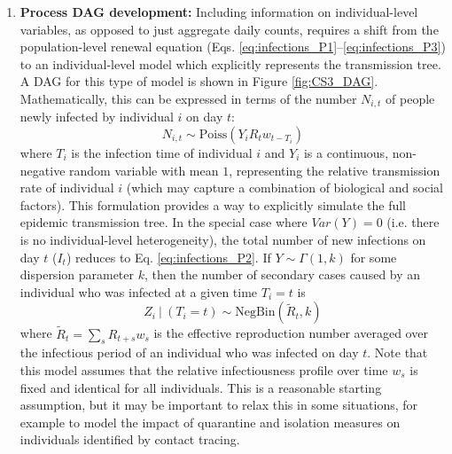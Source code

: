 \documentclass{article}
\begin{document}
\begin{enumerate}
    \item \textbf{Process DAG development:} Including information on individual-level variables, as opposed to just aggregate daily counts, requires a shift from the population-level renewal equation (Eqs. \eqref{eq:infections_P1}--\eqref{eq:infections_P3}) to an individual-level model which explicitly represents the transmission tree. A DAG for this type of model is shown in Figure \ref{fig:CS3_DAG}. Mathematically, this can be expressed in terms of the number $N_{i,t}$ of people newly infected by individual $i$ on day $t$:
    \begin{equation} \label{eq:individual_level}
    N_{i,t} \sim \mathrm{Poiss} \left( Y_i R_t w_{t-T_i} \right)
    \end{equation}
    where $T_i$ is the infection time of individual $i$ and $Y_i$ is a continuous, non-negative random variable with mean $1$, representing the relative transmission rate of individual $i$ (which may capture a combination of biological and social factors). This formulation provides a way to explicitly simulate the full epidemic transmission tree.  In the special case where $Var(Y)=0$ (i.e. there is no individual-level heterogeneity), the total number of new infections on day $t$ ($I_t$) reduces to Eq. \eqref{eq:infections_P2}. 
    If $Y\sim \Gamma(1,k)$ for some dispersion parameter $k$, then the number of secondary cases caused by an individual who was infected at a given time $T_i=t$ is \citep{lloyd2005superspreading}
     \begin{equation} \label{eq:offspring_dist}
        Z_i \ | \ (T_i=t) \sim \mathrm{NegBin}\left( \tilde{R}_{t}, k\right)
    \end{equation}   
    where $\tilde{R}_t= \sum_s R_{t+s} w_s$ is the effective reproduction number averaged over the infectious period of an individual who was infected on day $t$.
    Note that this model assumes that the relative infectiousness profile over time $w_s$ is fixed and identical for all individuals. This is a reasonable starting assumption, but it may be important to relax this in some situations, for example to model the impact of quarantine and isolation measures on individuals identified by contact tracing.

\end{enumerate}
\end{document}
